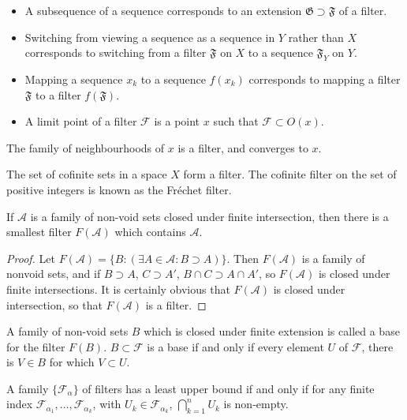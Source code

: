 \begin{example}
\begin{itemize}
    \item A subsequence of a sequence corresponds to an extension $\mathfrak{G} \supset \mathfrak{F}$ of a filter.
    \item Switching from viewing a sequence as a sequence in $Y$ rather than $X$ corresponds to switching from a filter $\mathfrak{F}$ on $X$ to a sequence $\mathfrak{F}_Y$ on $Y$.
    \item Mapping a sequence $x_k$ to a sequence $f(x_k)$ corresponds to mapping a filter $\mathfrak{F}$ to a filter $f(\mathfrak{F})$.
    \item A limit point of a filter $\mathcal{F}$ is a point $x$ such that $\mathcal{F} \subset O(x)$.
\end{itemize}

\begin{example}
    The family of neighbourhoods of $x$ is a filter, and converges to $x$.
\end{example}

\begin{example}
    The set of cofinite sets in a space $X$ form a filter. The cofinite filter on the set of positive integers is known as the Fr\'{e}chet filter.
\end{example}

\begin{lemma}
    If $\mathcal{A}$ is a family of non-void sets closed under finite intersection, then there is a smallest filter $F(\mathcal{A})$ which contains $\mathcal{A}$.
\end{lemma}
\begin{proof}
    Let $F(\mathcal{A}) = \{ B : (\exists A \in \mathcal{A}: B \supset A) \}$. Then $F(\mathcal{A})$ is a family of nonvoid sets, and if $B \supset A$, $C \supset A'$, $B \cap C \supset A \cap A'$, so $F(\mathcal{A})$ is closed under finite intersections. It is certainly obvious that $F(\mathcal{A})$ is closed under intersection, so that $F(\mathcal{A})$ is a filter.
\end{proof}

A family of non-void sets $B$ which is closed under finite extension is called a base for the filter $F(B)$. $B \subset \mathcal{F}$ is a base if and only if every element $U$ of $\mathcal{F}$, there is $V \in B$ for which $V \subset U$.

\begin{corollary}
    A family $\{ \mathcal{F}_\alpha \}$ of filters has a least upper bound if and only if for any finite index $\mathcal{F}_{\alpha_1}, \dots, \mathcal{F}_{\alpha_k}$, with $U_k \in \mathcal{F}_{\alpha_k}$, $\bigcap_{k = 1}^n U_k$ is non-empty.
\end{corollary}


\end{example}
